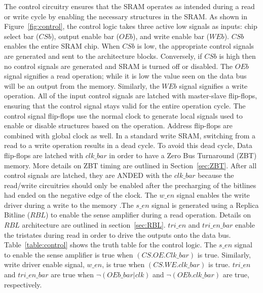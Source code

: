 The control circuitry ensures that the SRAM operates as intended during a read or write cycle by enabling the necessary structures in the SRAM. 
As shown in Figure~\ref{fig:control}, the control logic takes three active low signals as inputs: chip select bar ($CSb$), 
output enable bar ($OEb$), and write enable bar ($WEb$). $CSb$ enables the entire SRAM chip. 
When $CSb$ is low, the appropriate control signals are generated and sent to the architecture blocks.  
Conversely, if $CSb$ is high then no control signals are generated and SRAM is turned off or disabled. 
The $OEb$ signal signifies a read operation; while it is low the value seen on the data bus will be an output from the memory. 
Similarly, the $WEb$ signal signifies a write operation. All of the input control signals are latched with master-slave flip-flops, 
ensuring that the control signal stays valid for the entire operation cycle. The control signal flip-flops use the normal clock to generate 
local signals used to enable or disable structures based on the operation. Address flip-flops are combined with global clock as well. 
In a standard write SRAM, switching from a read to a write operation results in a dead cycle. To avoid this dead cycle, Data flip-flops are 
latched with $clk\_bar$ in order to have a Zero Bus Turnaround (ZBT) memory. More details on ZBT timing are outlined in Section~\ref{sec:ZBT}. 
After all control signals are latched, they are ANDED with the $clk\_bar$ because the read/write circuitries should only be enabled after the precharging of 
the bitlines had ended on the negative edge of the clock. The $w\_en$ signal enables the write driver during a write to the memory .The $s\_en$ signal 
is generated using a Replica Bitline ($RBL$) to enable the sense amplifier during a read operation. Details on $RBL$ architecture are outlined in section~\ref{sec:RBL}. 
$tri\_en$ and $tri\_en\_bar$ enable the tristates during read in order to drive the outputs onto the data bus. 
Table~\ref{table:control} shows the truth table for the control logic. The $s\_en$ signal to enable the sense amplifier is 
true when $(CS  .  OE  .  Clk\_bar)$ is true. Similarly, write driver enable signal, $w\_en$, is true when $(CS  .  WE .  clk\_bar)$ is true.  
$tri\_en$ and $tri\_en\_bar$ are true when $\neg(OEb\_bar  |  clk)$ and $\neg(OEb  .  clk\_bar)$ are true, respectively.
